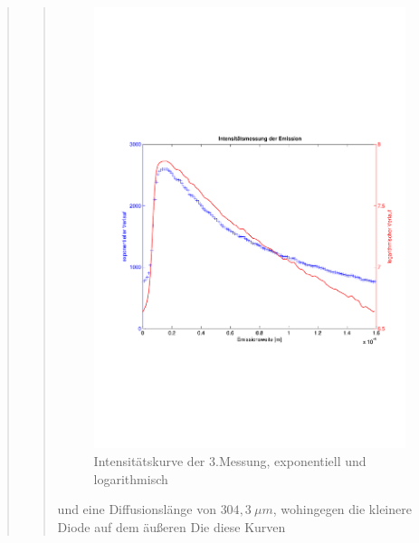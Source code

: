 \begin{quote}
\begin{quote}
        \begin{figure}[H]
                    \centering
                        \includegraphics[scale=0.53, trim = 1cm 6cm 1.5cm 8cm,
                        clip]{./Emissionsbilder/drei/Intensitat_3.pdf}
                        \caption{Intensitätskurve der 3.Messung, exponentiell
                        und logarithmisch}
                            \label{fig:./Emissionsbilder/drei/Intensitatsmessung.pdf}
        \end{figure}

        und eine Diffusionslänge von $304,3\ \mu m$, wohingegen die kleinere
        Diode auf dem äußeren Die diese Kurven


\end{quote}
\end{quote}
